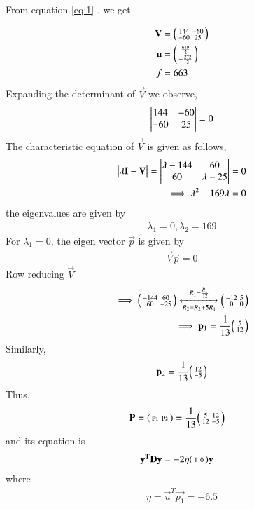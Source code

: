 \documentclass[journal,12pt,twocolumn]{IEEEtran}
\begin{document}
From equation \eqref{eq:1} , we get

\begin{align}
	\mathbf{V} &= \begin{psmallmatrix}144&-60\\-60&25\end{psmallmatrix}\label{eq:2}\\
	\mathbf{u} &= \begin{psmallmatrix}\frac{619}{2}\\-\frac{272}{2}\end{psmallmatrix}\label{eq:3}\\ 
	f &= 663 \label{eq:conics/ex/solution/given2}
\end{align}
Expanding the determinant of $\vec{V}$ we observe, 
\begin{align}
	\begin{vmatrix}144&-60\\-60&25\end{vmatrix} = 0 \label{eq:4}
\end{align}
The characteristic equation of $\vec{V}$ is given as follows,
\begin{align}
		\begin{vmatrix}\lambda\mathbf{I}-\mathbf{V}\end{vmatrix} = \begin{vmatrix}\lambda-144&60\\60&\lambda-25\end{vmatrix} &= 0\\
		\implies \lambda^2-169\lambda &= 0\label{eq:5}
\end{align}
 the eigenvalues are given by
\begin{align}
		\lambda_1=0, \lambda_2=169\label{eq:6}    
\end{align}
For $\lambda_1 = 0$, the eigen vector $\vec{p}$ is given by 
\begin{align}
		\vec{V}\vec{p} = 0
\end{align}
Row reducing $\vec{V}$ 
\begin{align}
		\implies
		\begin{psmallmatrix}-144&60\\60&-25\end{psmallmatrix}\xleftrightarrow[R_2=R_2+5R_1]{R_1=\frac{R_1}{12}}\begin{psmallmatrix}-12&5\\0&0\end{psmallmatrix}\\
		\implies\mathbf{p}_1=\frac{1}{13}\begin{psmallmatrix}5\\12\end{psmallmatrix} \label{eq:7}
\end{align}
Similarly, 
\begin{align}
		\mathbf{p}_2=\frac{1}{13}\begin{psmallmatrix}12\\-5\end{psmallmatrix} \label{eq:8}
\end{align}
	Thus,
\begin{align}
		\mathbf{P}&=\begin{psmallmatrix}\mathbf{p_1}&\mathbf{p_2}\end{psmallmatrix}=\frac{1}{13}\begin{psmallmatrix}5&12\\ 12 &-5\end{psmallmatrix} 
\end{align}
and its equation is
\begin{align}
		\mathbf{y^T}\mathbf{D}\mathbf{y}&=-2\eta\begin{psmallmatrix}1&0\end{psmallmatrix}\mathbf{y}
\end{align}
where
\begin{align}
		\eta=\vec{u}^T\vec{p_1}=-6.5
\end{align}
\end{document}
